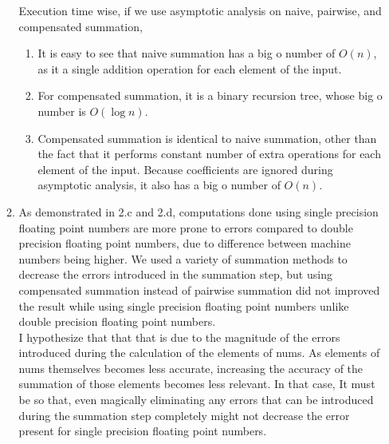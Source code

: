 \documentclass[10pt,a4paper, margin=1in]{article}
\begin{document}
\begin{enumerate}
\begin{enumerate}
\begin{table}[H]
\begin{tabular}{l|l|l}
    		\end{tabular}
    	\end{table}
    	Execution time wise, if we use asymptotic analysis on naive, pairwise, and compensated summation,
    	\begin{enumerate}
    		\item It is easy to see that naive summation has a big o number of $O(n)$, as it a single addition operation for each element of the input.
    		\item For compensated summation, it is a binary recursion tree, whose big o number is $O(\log n)$.
    		\item Compensated summation is identical to naive summation, other than the fact that it performs constant number of extra operations for each element of the input. Because coefficients are ignored during asymptotic analysis, it also has a big o number of $O(n)$.
    	\end{enumerate}
    	\item %
    	As demonstrated in 2.c and 2.d, computations done using single precision floating point numbers are more prone to errors compared to double precision floating point numbers, due to difference between machine numbers being higher. We used a variety of summation methods to decrease the errors introduced in the summation step, but using compensated summation instead of pairwise summation did not improved the result while using single precision floating point numbers unlike double precision floating point numbers.\\
    	I hypothesize that that that is due to the magnitude of the errors introduced during the calculation of the elements of nums. As elements of nums themselves becomes less accurate, increasing the accuracy of the summation of those elements becomes less relevant. In that case, It must be so that, even magically eliminating any errors that can be introduced during the summation step completely might not decrease the error present for single precision floating point numbers. 
    \end{enumerate}

\end{enumerate}
\end{document}
